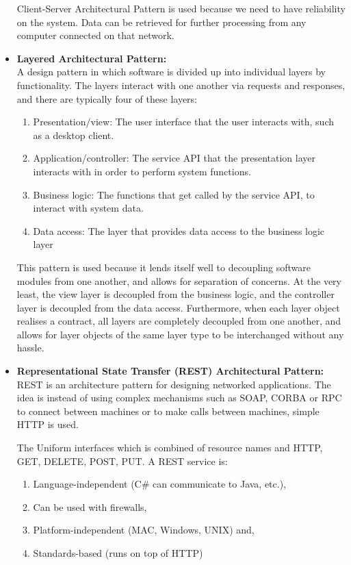 \documentclass[a4paper,10pt]{article}
\begin{document}
\begin{itemize}
			Client-Server Architectural Pattern is used because we need to have reliability on the system. Data can be retrieved for further processing from any computer connected on that network.
	
		\item \textbf{Layered Architectural Pattern:}\\
		A design pattern in which software is divided up into individual layers by functionality. The layers interact with one another via requests and responses, and there are typically four of these layers:
		\begin{enumerate}
			\item Presentation/view: The user interface that the user interacts with, such as a desktop client.
			\item Application/controller: The service API that the presentation layer interacts with in order to perform system functions.
			\item Business logic: The functions that get called by the service API, to interact with system data.
			\item Data access: The layer that provides data access to the business logic layer 
		\end{enumerate}
		
		This pattern is used because it lends itself well to decoupling software modules from one another, and allows for separation of concerns. At the very least, the view layer is decoupled from the business logic, and the controller layer is decoupled from the data access. Furthermore, when each layer object realises a contract, all layers are completely decoupled from one another, and allows for layer objects of the same layer type to be interchanged without any hassle. 
		
		\item \textbf{Representational State Transfer (REST) Architectural Pattern:}\\
		REST is an architecture pattern for designing networked applications. The idea is instead of using complex mechanisms such as SOAP, CORBA or RPC to connect between machines or to make calls between machines, simple HTTP is used.
		
		The Uniform interfaces which is combined of resource names and HTTP, GET, DELETE, POST, PUT.
			A REST service is:
		\begin{enumerate}
			\item Language-independent (C\# can communicate to Java, etc.),
			\item Can be used with firewalls,
			\item Platform-independent (MAC, Windows, UNIX) and,
			\item Standards-based (runs on top of HTTP)
		\end{enumerate}
		

\end{itemize}
\end{document}
